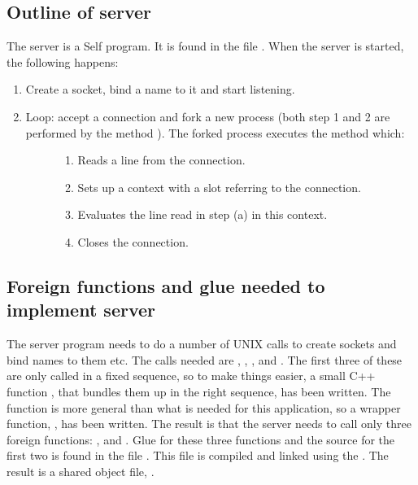 \documentclass[letterpaper,10pt,english]{sphinxmanual}
\begin{document}
\subsection{Outline of server}
\label{vmref:outline-of-server}
The server is a Self program. It is found in the file . When the server is started, the
following happens:
\begin{enumerate}
\item {} 
Create a socket, bind a name to it and start listening.

\item {} \begin{description}
\item[{Loop: accept a connection and fork a new process (both step 1 and 2 are performed by the method ). The forked process executes the method  which:}] \leavevmode\begin{enumerate}
\item {} 
Reads a line from the connection.

\item {} 
Sets up a context with a slot  referring to the connection.

\item {} 
Evaluates the line read in step (a) in this context.

\item {} 
Closes the connection.

\end{enumerate}

\end{description}

\end{enumerate}


\subsection{Foreign functions and glue needed to implement server}
\label{vmref:foreign-functions-and-glue-needed-to-implement-server}
The server program needs to do a number of UNIX calls to create sockets and bind names to them
etc. The calls needed are , , ,  and . The first three of these
are only called in a fixed sequence, so to make things easier, a small C++ function
, that bundles them up in the right sequence, has been written. The 
function is more general than what is needed for this application, so a wrapper function,
, has been written. The result is that the server needs to call only three foreign
functions: ,  and . Glue for these three functions
and the source for the first two is found in the file . This file is compiled and linked
using the . The result is a shared object file, .
\end{document}
